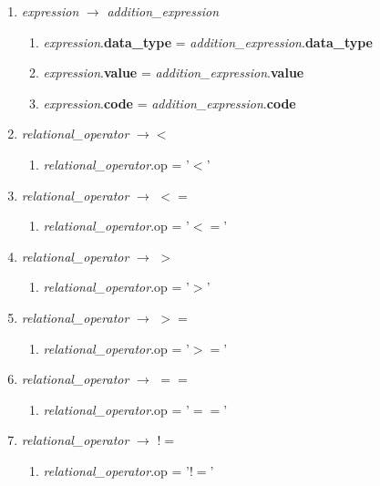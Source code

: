\documentclass[12pt]{article}
\begin{document}
\begin{enumerate}[label = \arabic*.]
\item \textit{ expression } $\rightarrow$ \textit{ addition\_expression} 
\begin{enumerate}[label = \roman*.]
\item \textit{expression}.\textbf{data\_type} = \textit{addition\_expression}.\textbf{data\_type}
\item \textit{expression}.\textbf{value} = \textit{addition\_expression}.\textbf{value}
\item \textit{expression}.\textbf{code} = \textit{addition\_expression}.\textbf{code}
\end{enumerate}

\item \textit{ relational\_operator } $\rightarrow < $
\begin{enumerate}[label = \roman*.]
\item \textit{relational\_operator}.op = '$<$'
\end{enumerate}

\item \textit{ relational\_operator } $\rightarrow$ $<=$
\begin{enumerate}[label = \roman*.]
\item \textit{relational\_operator}.op = '$<=$'
\end{enumerate}

\item \textit{ relational\_operator } $\rightarrow$ $>$
\begin{enumerate}[label = \roman*.]
\item \textit{relational\_operator}.op = '$>$'
\end{enumerate}

\item \textit{ relational\_operator } $\rightarrow$ $>=$
\begin{enumerate}[label = \roman*.]
\item \textit{relational\_operator}.op = '$>=$'
\end{enumerate}

\item \textit{ relational\_operator } $\rightarrow$ $==$
\begin{enumerate}[label = \roman*.]
\item \textit{relational\_operator}.op = '$==$'
\end{enumerate}

\item \textit{ relational\_operator } $\rightarrow$ $!=$
\begin{enumerate}[label = \roman*.]
\item \textit{relational\_operator}.op = '$!=$'
\end{enumerate}



\end{enumerate}
\end{document}
